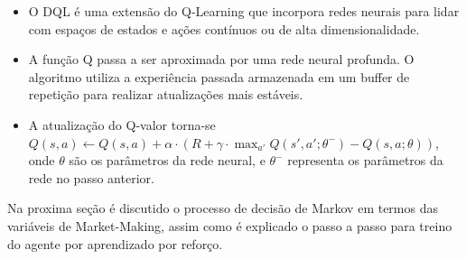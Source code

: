 \begin{itemize}
	\begin{itemize}
		\item O DQL é uma extensão do Q-Learning que incorpora redes neurais para lidar com espaços de estados e ações contínuos ou de alta dimensionalidade.
		\item A função Q passa a ser aproximada por uma rede neural profunda. O algoritmo utiliza a experiência passada armazenada em um buffer de repetição para realizar atualizações mais estáveis.
		\item A atualização do Q-valor torna-se \(Q(s, a) \leftarrow Q(s, a) + \alpha \cdot (R + \gamma \cdot \max_{a'} Q(s', a'; \theta^-) - Q(s, a; \theta))\), onde \(\theta\) são os parâmetros da rede neural, e \(\theta^-\) representa os parâmetros da rede no passo anterior.
	\end{itemize}
\end{itemize}

Na proxima seção é discutido o processo de decisão de Markov em termos das variáveis de Market-Making, assim como é explicado o passo a passo para treino do agente por aprendizado por reforço.